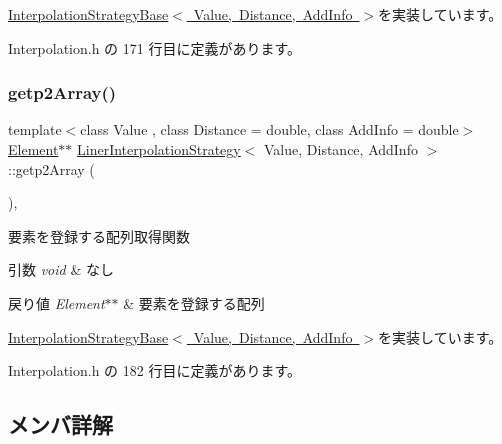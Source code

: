\mbox{\hyperlink{class_interpolation_strategy_base_a4d16fc821f0d503cc1fe4305022c4121}{Interpolation\+Strategy\+Base$<$ Value, Distance, Add\+Info $>$}}を実装しています。



 Interpolation.\+h の 171 行目に定義があります。

\mbox{\label{class_liner_interpolation_strategy_af8be5242260b3ea8670fd393a04af500}} 
\subsubsection{\texorpdfstring{getp2\+Array()}{getp2Array()}}
{\footnotesize\ttfamily template$<$class Value , class Distance  = double, class Add\+Info  = double$>$ \\
\mbox{\hyperlink{class_liner_interpolation_strategy_acbc8878179146c4a0f3ab0eb75c9d229}{Element}}$\ast$$\ast$ \mbox{\hyperlink{class_liner_interpolation_strategy}{Liner\+Interpolation\+Strategy}}$<$ Value, Distance, Add\+Info $>$\+::getp2\+Array (\begin{DoxyParamCaption}{ }\end{DoxyParamCaption})\hspace{0.3cm}{\ttfamily [inline]}, {\ttfamily [virtual]}}



要素を登録する配列取得関数 


\begin{DoxyParams}{引数}
{\em void} & なし \\
\hline
\end{DoxyParams}

\begin{DoxyRetVals}{戻り値}
{\em Element$\ast$$\ast$} & 要素を登録する配列 \\
\hline
\end{DoxyRetVals}


\mbox{\hyperlink{class_interpolation_strategy_base_aaccab96eb4f508e64a7a70f85c0e8d6a}{Interpolation\+Strategy\+Base$<$ Value, Distance, Add\+Info $>$}}を実装しています。



 Interpolation.\+h の 182 行目に定義があります。



\subsection{メンバ詳解}
\mbox{\label{class_liner_interpolation_strategy_ab1ab6953cb454416981877e7ee8997fa}} 
